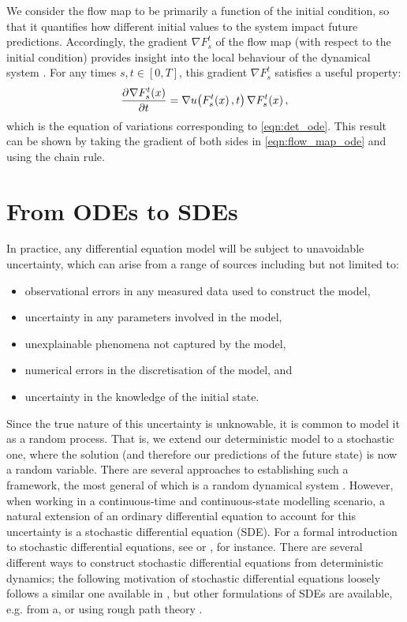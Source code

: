 We consider the flow map to be primarily a function of the initial condition, so that it quantifies how different initial values to the system impact future predictions.
Accordingly, the gradient \(\nabla F_s^t\) of the flow map (with respect to the initial condition) provides insight into the local behaviour of the dynamical system \citep{Arnold_1973_OrdinaryDifferentialEquations,TruesdellNoll_2004_NonLinearFieldTheories}.
For any times \(s, t \in [0,T]\), this gradient	\(\nabla F_s^t\) satisfies a useful property:
\begin{equation}
	\dpd{\nabla F_{s}^{t}\!\left(x\right)}{t} = \nabla u\!\left(F_{s}^{t}\!\left(x\right), t\right) \nabla F_{s}^{t}\!\left(x\right),
	\label{eqn:eqn_of_variations}
\end{equation}
which is the equation of variations corresponding to \cref{eqn:det_ode}.
This result can be shown by taking the gradient of both sides in \cref{eqn:flow_map_ode} and using the chain rule.




\section{From ODEs to SDEs}
In practice, any differential equation model will be subject to unavoidable uncertainty, which can arise from a range of sources including but not limited to:
\begin{itemize}
	\item observational errors in any measured data used to construct the model,
	\item uncertainty in any parameters involved in the model,
	\item unexplainable phenomena not captured by the model,
	\item numerical errors in the discretisation of the model, and
	\item uncertainty in the knowledge of the initial state.
\end{itemize}
Since the true nature of this uncertainty is unknowable, it is common to model it as a random process.
That is, we extend our deterministic model to a stochastic one, where the solution (and therefore our predictions of the future state) is now a random variable.
There are several approaches to establishing such a framework, the most general of which is a random dynamical system \citep{Arnold_1998_RandomDynamicalSystems,NeckelRupp_2013_RandomDifferentialEquations}.
However, when working in a continuous-time and continuous-state modelling scenario, a natural extension of an ordinary differential equation to account for this uncertainty is a stochastic differential equation (SDE).
For a formal introduction to stochastic differential equations, see \citet{Oksendal_2003_StochasticDifferentialEquations} or \citet{KallianpurSundar_2014_StochasticAnalysisDiffusion}, for instance.
There are several different ways to construct stochastic differential equations from deterministic dynamics; the following motivation of stochastic differential equations loosely follows a similar one available in \citet{Oksendal_2003_StochasticDifferentialEquations}, but other formulations of SDEs are available, e.g. from a, or using rough path theory \citep{FrizVictoir_2010_MultidimensionalStochasticProcesses}.

